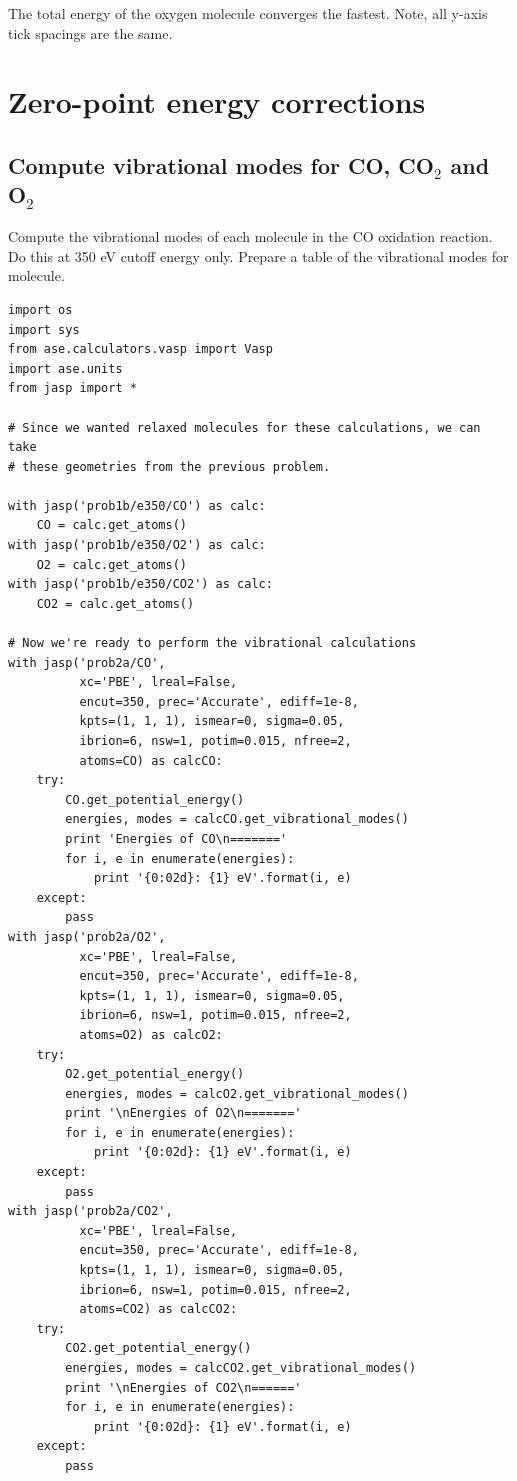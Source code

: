 \documentclass[11pt]{article}
\begin{document}
The total energy of the oxygen molecule converges the fastest. Note, all y-axis tick spacings are the same.
\section{Zero-point energy corrections}
\label{sec-2}
\subsection{Compute vibrational modes for CO, CO$_{2}$ and O$_{2}$}
\label{sec-2-1}

Compute the vibrational modes of each molecule in the CO oxidation reaction. Do this at 350 eV cutoff energy only. Prepare a table of the vibrational modes for molecule.


\begin{verbatim}
import os
import sys
from ase.calculators.vasp import Vasp
import ase.units
from jasp import *

# Since we wanted relaxed molecules for these calculations, we can take
# these geometries from the previous problem.

with jasp('prob1b/e350/CO') as calc:
    CO = calc.get_atoms()
with jasp('prob1b/e350/O2') as calc:
    O2 = calc.get_atoms()
with jasp('prob1b/e350/CO2') as calc:
    CO2 = calc.get_atoms()

# Now we're ready to perform the vibrational calculations
with jasp('prob2a/CO',
          xc='PBE', lreal=False,
          encut=350, prec='Accurate', ediff=1e-8,
          kpts=(1, 1, 1), ismear=0, sigma=0.05,
          ibrion=6, nsw=1, potim=0.015, nfree=2,
          atoms=CO) as calcCO:
    try:
        CO.get_potential_energy()
        energies, modes = calcCO.get_vibrational_modes()
        print 'Energies of CO\n======='
        for i, e in enumerate(energies):
            print '{0:02d}: {1} eV'.format(i, e)
    except:
        pass
with jasp('prob2a/O2',
          xc='PBE', lreal=False,
          encut=350, prec='Accurate', ediff=1e-8,
          kpts=(1, 1, 1), ismear=0, sigma=0.05,
          ibrion=6, nsw=1, potim=0.015, nfree=2,
          atoms=O2) as calcO2:
    try:
        O2.get_potential_energy()
        energies, modes = calcO2.get_vibrational_modes()
        print '\nEnergies of O2\n======='
        for i, e in enumerate(energies):
            print '{0:02d}: {1} eV'.format(i, e)
    except:
        pass
with jasp('prob2a/CO2',
          xc='PBE', lreal=False,
          encut=350, prec='Accurate', ediff=1e-8,
          kpts=(1, 1, 1), ismear=0, sigma=0.05,
          ibrion=6, nsw=1, potim=0.015, nfree=2,
          atoms=CO2) as calcCO2:
    try:
        CO2.get_potential_energy()
        energies, modes = calcCO2.get_vibrational_modes()
        print '\nEnergies of CO2\n======'
        for i, e in enumerate(energies):
            print '{0:02d}: {1} eV'.format(i, e)
    except:
        pass
\end{verbatim}
\end{document}
